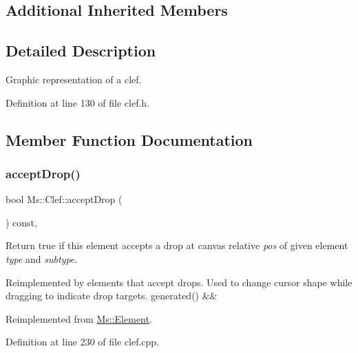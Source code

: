 \subsection*{Additional Inherited Members}


\subsection{Detailed Description}
Graphic representation of a clef. 

Definition at line 130 of file clef.\+h.



\subsection{Member Function Documentation}
\mbox{\label{class_ms_1_1_clef_ae91b3164063b5e25e704fdcd4fa292a3}} 
\subsubsection{\texorpdfstring{accept\+Drop()}{acceptDrop()}}
{\footnotesize\ttfamily bool Ms\+::\+Clef\+::accept\+Drop (\begin{DoxyParamCaption}\item[{\hyperlink{class_ms_1_1_edit_data}{Edit\+Data} \&}]{ }\end{DoxyParamCaption}) const\hspace{0.3cm}{\ttfamily [override]}, {\ttfamily [virtual]}}

Return true if this element accepts a drop at canvas relative {\itshape pos} of given element {\itshape type} and {\itshape subtype}.

Reimplemented by elements that accept drops. Used to change cursor shape while dragging to indicate drop targets. generated() \&\& 

Reimplemented from \hyperlink{class_ms_1_1_element_a35614445f0bc2212cbcc75c3f5810543}{Ms\+::\+Element}.



Definition at line 230 of file clef.\+cpp.

\mbox{\label{class_ms_1_1_clef_a3a9ca86d904b55728c1cd9c65b15ecef}} 
